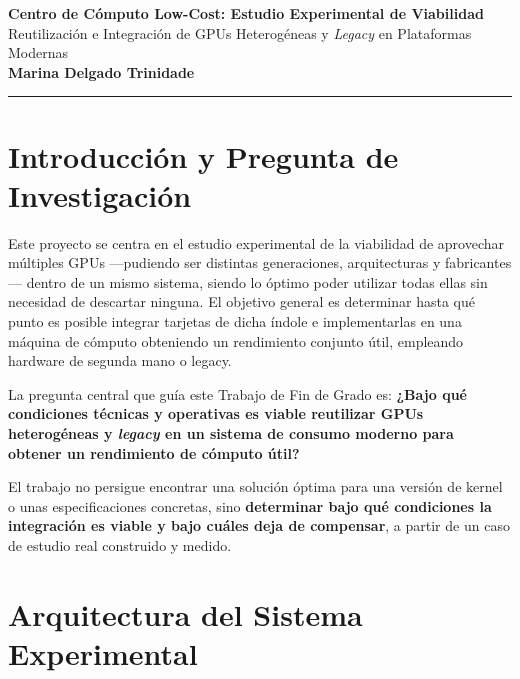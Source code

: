 \documentclass[a4paper,11pt]{article}
\begin{document}
\begin{center}
\vspace*{1mm}
{\Large \textbf{Centro de Cómputo Low-Cost: Estudio Experimental de Viabilidad}}\\[2mm]
{\normalsize Reutilización e Integración de GPUs Heterogéneas y \textit{Legacy} en Plataformas Modernas}\\[4mm]
{\small \textbf{Marina Delgado Trinidade}}\\[1mm]
\end{center}
\vspace{2mm}
\hrule
\vspace{3mm}

\section{Introducción y Pregunta de Investigación}

Este proyecto se centra en el estudio experimental de la viabilidad de aprovechar múltiples GPUs
—pudiendo ser distintas generaciones, arquitecturas y fabricantes— dentro de un mismo sistema,
siendo lo óptimo poder utilizar todas ellas sin necesidad de descartar ninguna. El objetivo general es
determinar hasta qué punto es posible integrar tarjetas de dicha índole e implementarlas en una máquina de
cómputo obteniendo un rendimiento conjunto útil, empleando hardware de segunda mano o legacy.

La pregunta central que guía este Trabajo de Fin de Grado es: \textbf{¿Bajo qué condiciones técnicas y operativas es viable reutilizar GPUs heterogéneas y \textit{legacy} en un sistema de consumo moderno para obtener un rendimiento de cómputo útil?}

El trabajo no persigue encontrar una solución óptima para una versión de kernel o unas especificaciones concretas, sino \textbf{determinar bajo qué condiciones la integración es viable y bajo cuáles deja de compensar}, a partir de un caso de estudio real construido y medido.

\section{Arquitectura del Sistema Experimental}
\end{document}
